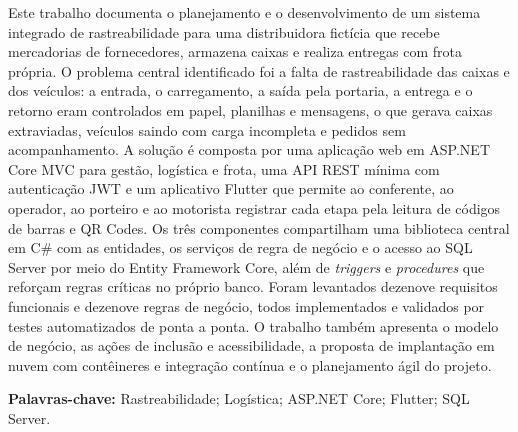 \begin{resumo}[RESUMO]
\SingleSpacing
Este trabalho documenta o planejamento e o desenvolvimento de um sistema integrado de rastreabilidade para uma distribuidora fictícia que recebe mercadorias de fornecedores, armazena caixas e realiza entregas com frota própria. O problema central identificado foi a falta de rastreabilidade das caixas e dos veículos: a entrada, o carregamento, a saída pela portaria, a entrega e o retorno eram controlados em papel, planilhas e mensagens, o que gerava caixas extraviadas, veículos saindo com carga incompleta e pedidos sem acompanhamento. A solução é composta por uma aplicação web em ASP.NET Core MVC para gestão, logística e frota, uma API REST mínima com autenticação JWT e um aplicativo Flutter que permite ao conferente, ao operador, ao porteiro e ao motorista registrar cada etapa pela leitura de códigos de barras e QR Codes. Os três componentes compartilham uma biblioteca central em C\# com as entidades, os serviços de regra de negócio e o acesso ao SQL Server por meio do Entity Framework Core, além de \textit{triggers} e \textit{procedures} que reforçam regras críticas no próprio banco. Foram levantados dezenove requisitos funcionais e dezenove regras de negócio, todos implementados e validados por testes automatizados de ponta a ponta. O trabalho também apresenta o modelo de negócio, as ações de inclusão e acessibilidade, a proposta de implantação em nuvem com contêineres e integração contínua e o planejamento ágil do projeto.

\vspace{\onelineskip}
\noindent\textbf{Palavras-chave:} Rastreabilidade; Logística; ASP.NET Core; Flutter; SQL Server.
\end{resumo}

